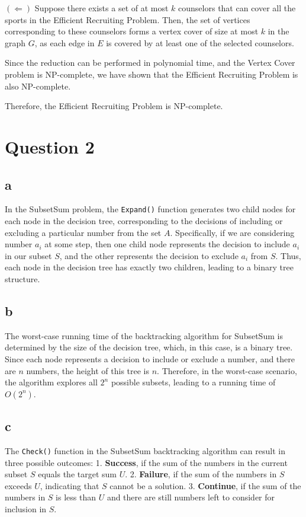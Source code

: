 \documentclass{article}
\begin{document}
$(\Leftarrow)$ Suppose there exists a set of at most $k$ counselors that can cover all the sports in the Efficient Recruiting Problem. Then, the set of vertices corresponding to these counselors forms a vertex cover of size at most $k$ in the graph $G$, as each edge in $E$ is covered by at least one of the selected counselors.

Since the reduction can be performed in polynomial time, and the Vertex Cover problem is NP-complete, we have shown that the Efficient Recruiting Problem is also NP-complete.

Therefore, the Efficient Recruiting Problem is NP-complete.


\section{Question 2}

\subsection{a}
In the SubsetSum problem, the \texttt{Expand()} function generates two child nodes for each node in the decision tree, corresponding to the decisions of including or excluding a particular number from the set $A$. Specifically, if we are considering number $a_i$ at some step, then one child node represents the decision to include $a_i$ in our subset $S$, and the other represents the decision to exclude $a_i$ from $S$. Thus, each node in the decision tree has exactly two children, leading to a binary tree structure.


\subsection{b}
The worst-case running time of the backtracking algorithm for SubsetSum is determined by the size of the decision tree, which, in this case, is a binary tree. Since each node represents a decision to include or exclude a number, and there are $n$ numbers, the height of this tree is $n$. Therefore, in the worst-case scenario, the algorithm explores all $2^n$ possible subsets, leading to a running time of $O(2^n)$.


\subsection{c}
The \texttt{Check()} function in the SubsetSum backtracking algorithm can result in three possible outcomes:
1. \textbf{Success}, if the sum of the numbers in the current subset $S$ equals the target sum $U$.
2. \textbf{Failure}, if the sum of the numbers in $S$ exceeds $U$, indicating that $S$ cannot be a solution.
3. \textbf{Continue}, if the sum of the numbers in $S$ is less than $U$ and there are still numbers left to consider for inclusion in $S$.
\end{document}
